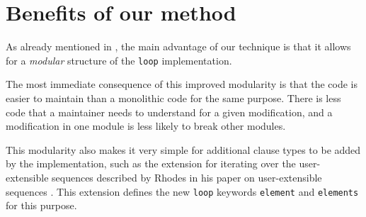 \section{Benefits of our method}
\label{sec-benefits}
 
As already mentioned in ,
the main advantage of our technique is that it allows for a
\emph{modular} structure of the \texttt{loop} implementation.

The most immediate consequence of this improved modularity is that the
code is easier to maintain than a monolithic code for the same
purpose.  There is less code that a maintainer needs to understand for
a given modification, and a modification in one module is less likely
to break other modules.

This modularity also makes it very simple for additional clause types
to be added by the \commonlisp{} implementation, such as the extension
for iterating over the user-extensible sequences described by Rhodes
in his paper on user-extensible sequences
\cite{Rhodes:2007:USC:1622123.1622138}.  This extension defines the
new \texttt{loop} keywords \texttt{element} and \texttt{elements} for
this purpose.
